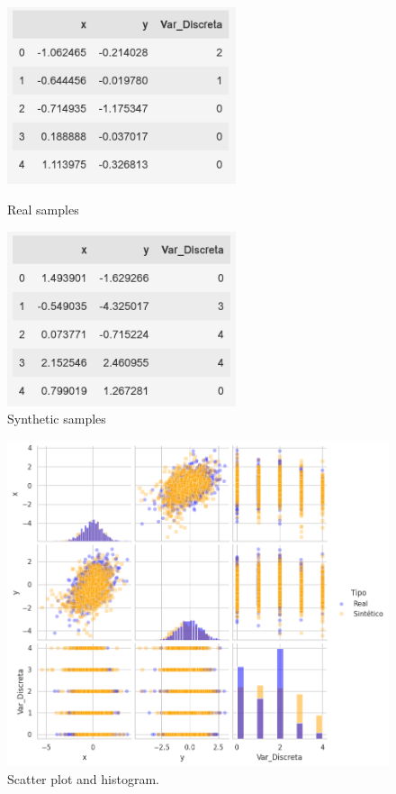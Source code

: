 \begin{figure}[htbp]
    \centering
    \begin{minipage}[b]{0.4\textwidth}
      \centering
      \includegraphics[width=0.6\textwidth]{figures/4-Advanced_Strategies/Ejemplo_Dataset_1_Real.png}
      \caption{Real samples}
    \end{minipage}
    \hfill
    \begin{minipage}[b]{0.4\textwidth}
      \centering
      \includegraphics[width=0.6\textwidth]{figures/4-Advanced_Strategies/Ejemplo_Dataset_1_Sintetico.png}
      \caption{Synthetic samples}
    \end{minipage}
\end{figure}

\begin{figure}[H]
    \centering
    \includegraphics[scale=.35]{figures/4-Advanced_Strategies/pairplot_Dataset1.png}
    \caption{Scatter plot and histogram.}
\end{figure}

